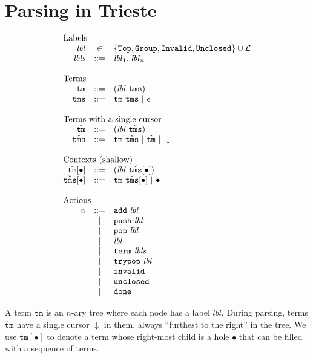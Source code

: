 \documentclass{article}
\newcommand{\labelFont}{\texttt}
\newcommand{\lbl}{\ensuremath{\mathit{lbl}}}
\newcommand{\lbls}{\ensuremath{\mathit{lbls}}}
\newcommand{\Top}{\ensuremath{\labelFont{Top}}}
\newcommand{\Group}{\ensuremath{\labelFont{Group}}}
\newcommand{\Invalid}{\ensuremath{\labelFont{Invalid}}}
\newcommand{\Unclosed}{\ensuremath{\labelFont{Unclosed}}}
\newcommand{\tm}{\ensuremath{\mathtt{tm}}}
\newcommand{\tms}{\ensuremath{\mathtt{tms}}}
\newcommand{\Tm}{\ensuremath{\check{\tm}}}
\newcommand{\Tms}{\ensuremath{\check{\tms}}}
\newcommand{\action}{\ensuremath{\alpha}}
\newcommand{\add}[1]{\ensuremath{\texttt{add}~#1}}
\newcommand{\push}[1]{\ensuremath{\texttt{push}~#1}}
\newcommand{\pop}[1]{\ensuremath{\texttt{pop}~#1}}
\newcommand{\trypop}[1]{\ensuremath{\texttt{trypop}~#1}}
\newcommand{\term}[1]{\ensuremath{\texttt{term}~#1}}
\newcommand{\invalid}{\ensuremath{\texttt{invalid}}}
\newcommand{\unclosed}{\ensuremath{\texttt{unclosed}}}
\newcommand{\done}{\ensuremath{\texttt{done}}}
\newcommand{\cursor}{\ensuremath{\downarrow}}
\newcommand{\pseq}[2]{\ensuremath{#1 \cdot #2}}
\newcommand{\arrayheading}[2]{\multicolumn{#1}{l}{\mbox{#2}}}
\begin{document}
\section{Parsing in Trieste}

\[
  \begin{array}{rcl}
    \arrayheading{3}{Labels}\\
    \lbl  & \in & \{\Top, \Group, \Invalid, \Unclosed\}\cup \mathcal{L} \\
    \lbls & ::= & \lbl_1 .. \lbl_n\\
    \\
    \arrayheading{3}{Terms}\\
    \tm  & ::= & (\lbl~\tms) \\
    \tms & ::= & \tm ~ \tms ~|~ \epsilon \\
    \\
    \arrayheading{3}{Terms with a single cursor}\\
    \Tm  & ::= & (\lbl~\Tms)\\
    \Tms & ::= & \tm ~ \Tms ~|~ \Tm ~|~ \cursor\\
    \\
    \arrayheading{3}{Contexts (shallow)}\\
    \Tm[\bullet] & ::= & (\lbl~\Tms[\bullet])\\
    \Tms[\bullet] & ::= & \tm ~ \Tms[\bullet] ~|~ \bullet\\
    \\
    \arrayheading{3}{Actions}\\
    \action & ::= & \add{\lbl}\\
            & ~|~ & \push{\lbl}\\
            & ~|~ & \pop{\lbl}\\
            & ~|~ & \pseq{\lbl}\\
            & ~|~ & \term{\lbls}\\
            & ~|~ & \trypop{\lbl}\\
            & ~|~ & \invalid\\
            & ~|~ & \unclosed\\
            & ~|~ & \done\\
  \end{array}
\]

A term \tm{} is an $n$-ary tree where each node has a label \lbl.
%
During parsing, terms \Tm{} have a single cursor \cursor{} in them,
always ``furthest to the right'' in the tree.
%
We use $\Tm[\bullet]$ to denote a term whose right-most child is a
hole $\bullet$ that can be filled with a sequence of terms.
\end{document}
